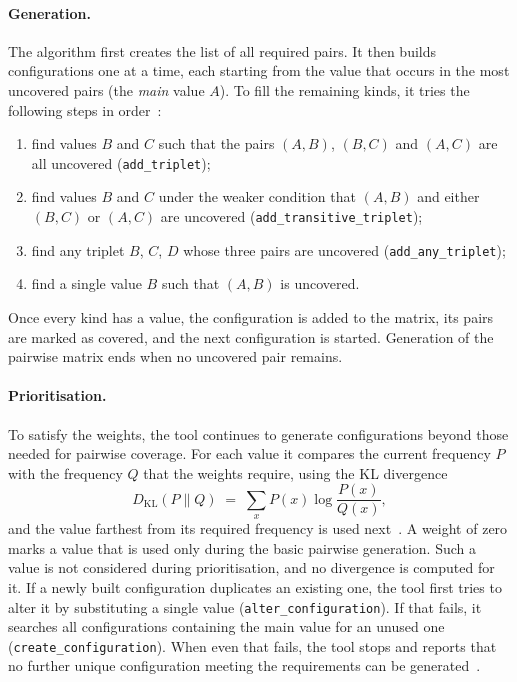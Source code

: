 \documentclass[
  digital, %
  oneside, %
  lof,     %
  nolot,     %
]{fithesis4}
\begin{document}
\paragraph{Generation.} The algorithm first creates the list of all required
pairs. It then builds configurations one at a time, each starting from the value
that occurs in the most uncovered pairs (the \emph{main} value $A$). To fill the
remaining kinds, it tries the following steps in order~\cite[pp.~25--26]{Urban2024thesis}:
%
\begin{enumerate}
  \item find values $B$ and $C$ such that the pairs $(A,B)$, $(B,C)$ and $(A,C)$
        are all uncovered (\texttt{add\_triplet});
  \item find values $B$ and $C$ under the weaker condition that $(A,B)$ and
        either $(B,C)$ or $(A,C)$ are uncovered (\texttt{add\_transitive\_triplet});
  \item find any triplet $B$, $C$, $D$ whose three pairs are uncovered
        (\texttt{add\_any\_triplet});
  \item find a single value $B$ such that $(A,B)$ is uncovered.
\end{enumerate}
%
Once every kind has a value, the configuration is added to the matrix, its pairs
are marked as covered, and the next configuration is started. Generation of the
pairwise matrix ends when no uncovered pair remains.

\paragraph{Prioritisation.} To satisfy the weights, the tool continues to
generate configurations beyond those needed for pairwise coverage. For each
value it compares the current frequency $P$ with the frequency $Q$ that the
weights require, using the \gls{KL} divergence
%
\begin{equation}
  \label{eq:kl}
  D_{\mathrm{KL}}(P \parallel Q) \;=\; \sum_{x} P(x) \log \frac{P(x)}{Q(x)},
\end{equation}
%
and the value farthest from its required frequency is used
next~\cite[pp.~20--21, 26--28]{Urban2024thesis}. A weight of zero marks a value that
is used only during the basic pairwise generation. Such a value is not
considered during prioritisation, and no divergence is computed for it. If a
newly built configuration duplicates an existing one, the tool first tries to
alter it by substituting a single value (\texttt{alter\_configuration}). If that
fails, it searches all configurations containing the main value for an unused
one (\texttt{create\_configuration}). When even that fails, the tool stops and
reports that no further unique configuration meeting the requirements can be
generated~\cite[p.~28]{Urban2024thesis}.
\end{document}
